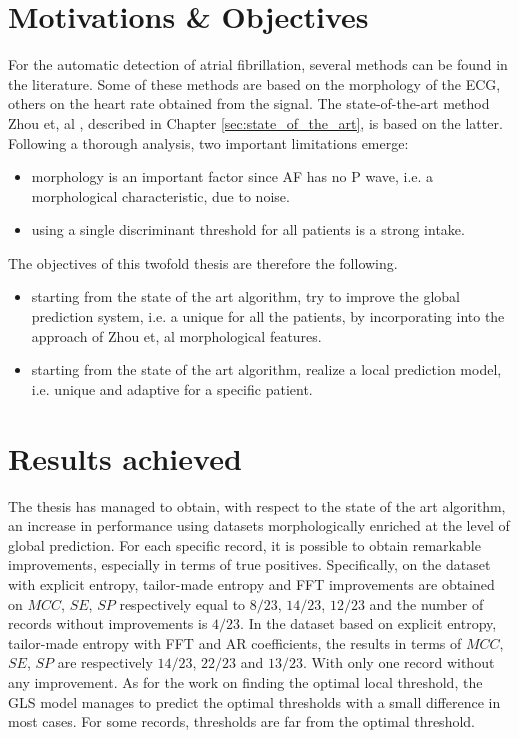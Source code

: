 \section{Motivations \& Objectives}
For the automatic detection of atrial fibrillation, several methods can be found in the literature. Some of these methods are based on the morphology of the ECG, others on the heart rate obtained from the signal. The state-of-the-art method Zhou et, al \cite{zhou2015}, described in Chapter \ref{sec:state_of_the_art}, is based on the latter. Following a thorough analysis, two important limitations emerge:
\begin{itemize}
\item morphology is an important factor since AF has no P wave, i.e. a morphological characteristic, due to noise.
\item using a single discriminant threshold for all patients is a strong intake.
\end{itemize}
The objectives of this twofold thesis are therefore the following.
\begin{itemize}
\item starting from the state of the art algorithm, try to improve the global prediction system, i.e. a unique for all the patients, by incorporating into the approach of Zhou et, al morphological features.
\item starting from the state of the art algorithm, realize a local prediction model, i.e. unique and adaptive for a specific patient.
\end{itemize}

\section{Results achieved}
The thesis has managed to obtain, with respect to the state of the art algorithm, an increase in performance using datasets morphologically enriched at the level of global prediction. For each specific record, it is possible to obtain remarkable improvements, especially in terms of true positives. Specifically, on the dataset with explicit entropy, tailor-made entropy and FFT improvements are obtained on $MCC$, $SE$, $SP$ respectively equal to $8/23$, $14/23$, $12/23$ and the number of records without improvements is $4/23$. In the dataset based on explicit entropy, tailor-made entropy with FFT and AR coefficients, the results in terms of $MCC$, $SE$, $SP$ are respectively $14/23$, $22/23$ and $13/23$. With only one record without any improvement.
As for the work on finding the optimal local threshold, the GLS model manages to predict the optimal thresholds with a small difference in most cases. For some records, thresholds are far from the optimal threshold.

